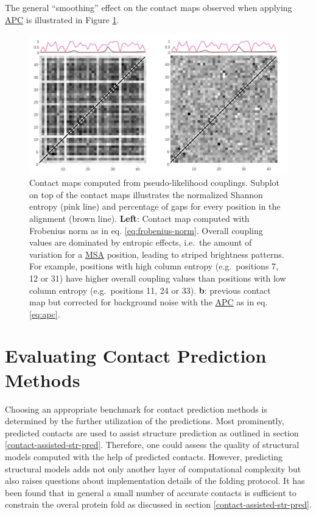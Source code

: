 \documentclass[12pt,a4paper,twoside]{book}
\theoremstyle{definition}
\theoremstyle{definition}
\theoremstyle{remark}
\begin{document}
The general ``smoothing'' effect on the contact maps observed when
applying \protect\hyperlink{abbrev}{APC} is illustrated in Figure
\ref{fig:apc-correction}.















\begin{figure}

{\centering \includegraphics[width=0.8\linewidth]{img/intro/apc_correction_with_entropy} 

}

\caption{Contact maps computed from
pseudo-likelihood couplings. Subplot on top of the contact maps
illustrates the normalized Shannon entropy ({pink } line) and percentage
of gaps for every position in the alignment ({brown } line).
\textbf{Left}: Contact map computed with Frobenius norm as in eq.
\eqref{eq:frobenius-norm}. Overall coupling values are dominated by
entropic effects, i.e.~the amount of variation for a
\protect\hyperlink{abbrev}{MSA} position, leading to striped brightness
patterns. For example, positions with high column entropy
(e.g.~positions 7, 12 or 31) have higher overall coupling values than
positions with low column entropy (e.g.~positions 11, 24 or 33).
\textbf{b}: previous contact map but corrected for background noise with
the \protect\hyperlink{abbrev}{APC} as in eq. \eqref{eq:apc}.}\label{fig:apc-correction}
\end{figure}

\section{Evaluating Contact Prediction
Methods}\label{intro-cp-evaluation}

Choosing an appropriate benchmark for contact prediction methods is
determined by the further utilization of the predictions. Most
prominently, predicted contacts are used to assist structure prediction
as outlined in section \ref{contact-assisted-str-pred}. Therefore, one
could assess the quality of structural models computed with the help of
predicted contacts. However, predicting structural models adds not only
another layer of computational complexity but also raises questions
about implementation details of the folding protocol. It has been found
that in general a small number of accurate contacts is sufficient to
constrain the overal protein fold as discussed in section
\ref{contact-assisted-str-pred}.
\end{document}
